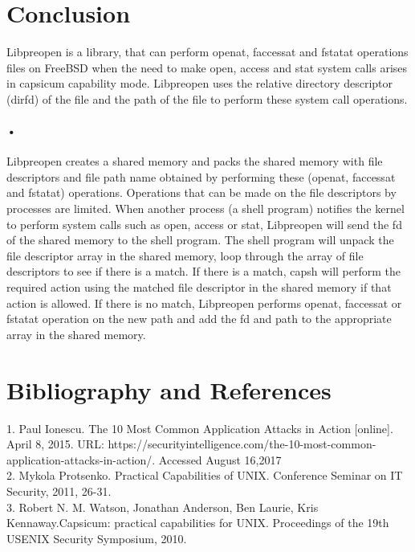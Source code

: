 \documentclass{article}
\begin{document}
\section{Conclusion}
Libpreopen is a library, that can perform openat, faccessat and fstatat operations files on
FreeBSD when the need to make open, access and stat system calls arises in capsicum capability mode. 
Libpreopen uses the relative directory descriptor (dirfd) of the file and the path of the file to 
perform these system call operations.\paragraph*{•}

Libpreopen creates a shared memory and packs the shared memory with file descriptors and file path name
obtained by performing these (openat, faccessat and fstatat) operations. Operations that can be made on 
the file descriptors by processes are  limited. When another process (a shell program) notifies the kernel
to perform system calls such as open, access or stat, Libpreopen will send the fd of the shared memory to 
the shell program. The shell program will unpack the file descriptor array in the shared memory, loop through
the array of file descriptors to see if there is a match. If there is a match, capsh  will perform the required
action using the matched file descriptor in the shared memory if that action is allowed. If there is no match,
Libpreopen performs openat, faccessat or fstatat operation on the new path and add the fd and path to the appropriate 
array in the shared memory.

\section{Bibliography and References}
 1.	Paul Ionescu. The 10 Most Common Application Attacks in Action [online]. April 8, 2015. URL: https://securityintelligence.com/the-10-most-common-application-attacks-in-action/. Accessed August 16,2017 \\
 2.	Mykola Protsenko. Practical Capabilities of UNIX. Conference Seminar on IT Security, 2011, 26-31.\\
3.	Robert N. M. Watson, Jonathan Anderson, Ben Laurie, Kris Kennaway.Capsicum: practical capabilities for UNIX. Proceedings of the 19th USENIX Security Symposium, 2010.\\

 
 
\end{document}
